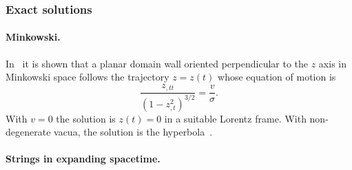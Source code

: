 




\subsubsection{Exact solutions}

    \paragraph{Minkowski.} %
    In~\citet{garrigaPerturbationsDomainWalls1991} it is shown that a planar domain wall oriented perpendicular to the $z$ axis in Minkowski space follows the trajectory $z=z(t)$ whose equation of motion is 
    \begin{equation}
        \frac{z_{,tt}}{{(1-z_{,t}^2)}^{3/2}} = \frac{v}{\sigma}.
    \end{equation}
    With $v=0$ the solution is $z(t)=0$ in a suitable Lorentz frame. %
    With non-degenerate vacua, the solution is the hyperbola~\citep{garrigaPerturbationsDomainWalls1991}.
    

    \paragraph{Strings in expanding spacetime.} %





